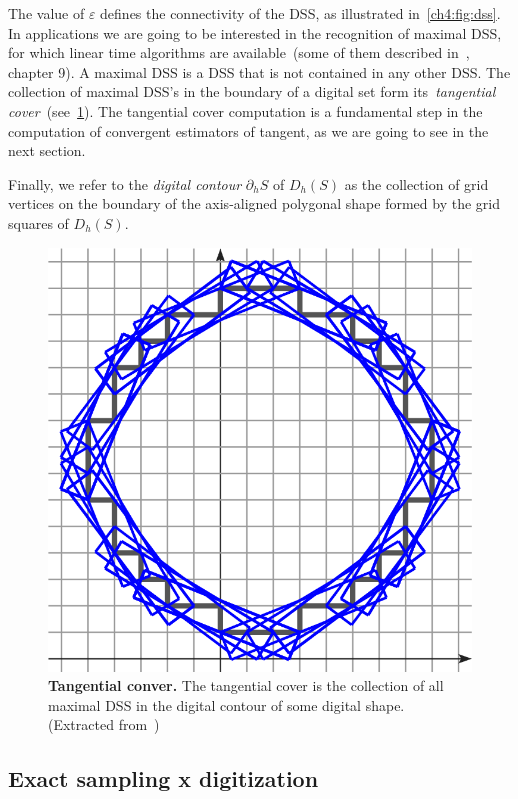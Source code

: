 The value of $\varepsilon$ defines the connectivity of the DSS, as illustrated in~\cref{ch4:fig:dss}. In applications we are going to be interested in the recognition of maximal DSS, for which linear time algorithms are available~(some of them described in~\cite{klette04digital}, chapter 9). A maximal DSS is a DSS that is not contained in any other DSS. The collection of maximal DSS's in the boundary of a digital set form its~\emph{tangential cover}~(see~\cref{ch4:fig:tangential-cover}). The tangential cover computation is a fundamental step in the computation of convergent estimators of tangent, as we are going to see in the next section.

Finally, we refer to the \emph{digital contour} $\partial_h S$ of $D_h(S)$ as the collection of grid vertices on the boundary of the axis-aligned polygonal shape formed by the grid squares of $D_h(S)$.

\begin{figure}
\center
\includegraphics[scale=1]{figures/chapter4/dss/tangential-cover.png}
\caption{\textbf{Tangential conver.} The tangential cover is the collection of all maximal DSS in the digital contour of some digital shape. (Extracted from~\cite{})}
\label{ch4:fig:tangential-cover}
\end{figure}


\subsection{Exact sampling x digitization}

